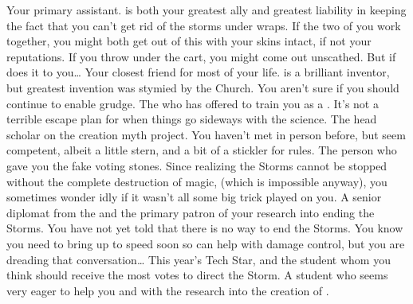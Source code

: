 \documentclass[char]{GL2020}
\begin{document}
\begin{contacts}
	\contact{\cAssistantScientist{}} Your primary assistant. \cAssistantScientist{} is both your greatest ally and greatest liability in keeping the fact that you can't get rid of the storms under wraps. If the two of you work together, you might both get out of this with your skins intact, if not your reputations. If you throw \cAssistantScientist{} under the cart, you might come out unscathed. But if \cAssistantScientist{\they} does it to you\ldots{}
	\contact{\cChupInventor{}} Your closest friend for most of your life. \cChupInventor{} is a brilliant inventor, but \cChupInventor{\their} greatest invention was stymied by the Church. You aren't sure if you should continue to enable \cChupInventor{\their} grudge.
	\contact{\cBeetle{}} The \cBeetle{\cleric} who has offered to train you as a \cHeadScientist{\cleric}. It's not a terrible escape plan for when things go sideways with the science.
	\contact{\cEbbPriest{}} The head scholar on the creation myth project. You haven't met in person before, but \cEbbPriest{\they} seem\cEbbPriest{\plural} competent, albeit a little stern, and a bit of a stickler for rules.
	\contact{\cEvil{}} The person who gave you the fake voting stones. Since realizing the Storms cannot be stopped without the complete destruction of magic, (which is impossible anyway), you sometimes wonder idly if it wasn't all some big trick played on you.
	\contact{\cDiplomat{}} A senior diplomat from the \pTech{} and the primary patron of your research into ending the Storms. You have not yet told \cDiplomat{\them} that there is no way to end the Storms. You know you need to bring \cDiplomat{\them} up to speed soon so \cDiplomat{\they} can help with damage control, but you are dreading that conversation\ldots{}
	\contact{\cTechStar{}} This year's Tech Star, and the \pTech{} student whom you think should receive the most votes to direct the Storm.
	\contact{\cScholarship{}} A student who seems very eager to help you and \cEbbPriest{} with the research into the creation of \pEarth{}.
\end{contacts}
\end{document}
